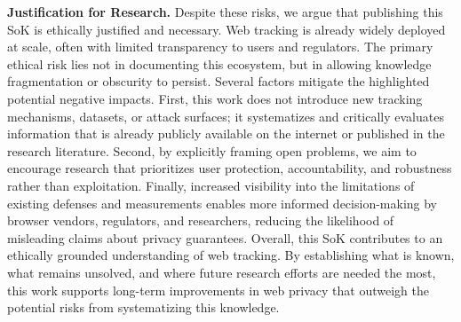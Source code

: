 \noindent \textbf{Justification for Research.}
%
Despite these risks, we argue that publishing this SoK is ethically justified and necessary. 
%
Web tracking is already widely deployed at scale, often with limited transparency to users and regulators. 
%
The primary ethical risk lies not in documenting this ecosystem, but in allowing knowledge fragmentation or obscurity to persist. 
%
Several factors mitigate the highlighted potential negative impacts. 
%
First, this work does not introduce new tracking mechanisms, datasets, or attack surfaces; it systematizes and critically evaluates information that is already publicly available on the internet or published in the research literature. 
%
Second, by explicitly framing open problems, we aim to encourage research that prioritizes user protection, accountability, and robustness rather than exploitation. 
%
Finally, increased visibility into the limitations of existing defenses and measurements enables more informed decision-making by browser vendors, regulators, and researchers, reducing the likelihood of misleading claims about privacy guarantees. 
%
Overall, this SoK contributes to an ethically grounded understanding of web tracking. 
%
By establishing what is known, what remains unsolved, and where future research efforts are needed the most, this work supports long-term improvements in web privacy that outweigh the potential risks from systematizing this knowledge.